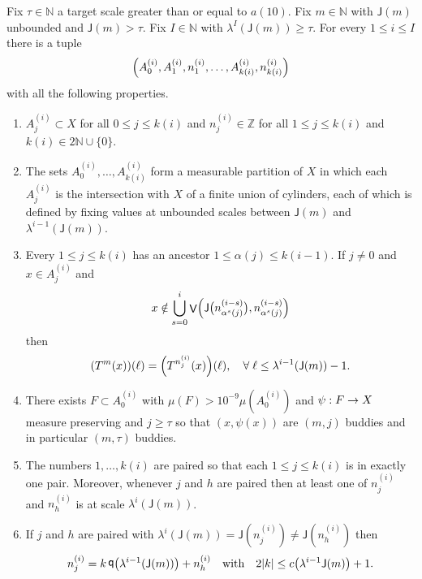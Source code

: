 \documentclass[10pt]{amsart}
\theoremstyle{definition}\newtheorem{defi}[theo]{Definition}\newtheorem{rema}[theo]{Remark}\newtheorem{exam}[theo]{Example}\newtheorem{exem}[theo]{Example}\newtheorem{nota}[theo]{Notation}
\DeclareMathOperator{\bad}{\mathsf{V}}
\DeclareMathOperator{\q}{\mathsf{q}}
\newcommand{\N}{\mathbb{N}}
\newcommand{\Z}{\mathbb{Z}}
\newcommand{\scl}{\mathsf{J}}
\let\originalleft\left
\let\originalright\right
\renewcommand{\left}{\mathopen{}\mathclose\bgroup\originalleft}
\renewcommand{\right}{\aftergroup\egroup\originalright}
\renewcommand*{\to}{\mathchoice{\longrightarrow}{\rightarrow}{\rightarrow}{\rightarrow}}
\newcommand*{\relabel}{\renewcommand{\labelenumi}{(\theenumi)}}
\newcommand*{\Eenumi}{\renewcommand*{\theenumi}{E\arabic{enumi}}\relabel}
\let\oldforall\forall
\renewcommand*{\forall}{\mathrel{\oldforall}}
\begin{document}
\begin{prop}\label{prop:reduction}
Fix $\tau \in \N$ a target scale greater than or equal to $a(10)$. Fix $m \in \N$ with $\scl(m)$ unbounded and $\scl(m) > \tau$. Fix $I \in \N$ with $\lambda^I(\scl(m)) \ge \tau$. For every $1 \le i \le I$ there is a tuple
\begin{equation}\label{eq:tuple}
\left(A_0^{(i)}, A_1^{(i)},n_1^{(i)}, \dots, A_{k(i)}^{(i)},n^{(i)}_{k(i)} \right)
\end{equation}
with all the following properties.
\begin{enumerate}\Eenumi
\item\label{cond:setup}
$A_j^{(i)} \subset X$ for all $0 \le j \le k(i)$ and $n^{(i)}_j \in \Z$ for all $1 \le j \le k(i)$ and $k(i) \in 2\N \cup \{0\}$.
\item\label{cond:partition}
The sets $A^{(i)}_0,\dots,A^{(i)}_{k(i)}$ form a measurable partition of $X$ in which each $A^{(i)}_j$ is the intersection with $X$ of a finite union of cylinders, each of which is defined by fixing values at unbounded scales between $\scl(m)$ and $\lambda^{i-1}(\scl(m))$.
\item\label{cond:agree}
Every $1 \le j \le k(i)$ has an ancestor $1 \le \alpha(j) \le k(i-1)$. If $j \ne 0$ and $x \in A_j^{(i)}$ and
\begin{equation}\label{eqn:bad ancestors}
x \notin \bigcup_{s=0}^i \bad \left(\scl \bigl(n^{(i-s)}_{\alpha^s(j)} \bigr), n^{(i-s)}_{\alpha^s(j)} \right)
\end{equation}
then
\begin{equation}\label{eq:same coords}
(T^m(x))(\ell) = \left(T^{n_j^{(i)}}(x)\right)(\ell),\quad \forall\ell\leq \lambda^{i-1}(\scl(m))-1.
\end{equation}
\item\label{cond:Azero friends}
There exists $F\subset A^{(i)}_0$ with $\mu(F)>10^{-9}\mu(A^{(i)}_0) $ and $\psi:F \to X$ measure preserving and $j \ge \tau$ so that $(x,\psi(x))$ are $(m,j)$ buddies and in particular $(m,\tau)$ buddies.
\item\label{cond:differ}
The numbers $1,\dots,k(i)$ are paired so that each $1 \le j \le k(i)$ is in exactly one pair. Moreover, whenever $j$ and $h$ are paired then at least one of $n_j^{(i)}$ and $n_h^{(i)}$ is at scale $\lambda^i(\scl(m))$.
\item\label{cond:paired numbers}
If $j$ and $h$ are paired with $\lambda^i(\scl(m)) = \scl(n_j^{(i)}) \ne \scl(n_h^{(i)})$ then
\[
n_j^{(i)}=k\q\left(\lambda^{i-1}(\scl(m))\right)+n_h^{(i)}\quad\text{with}\quad 2|k| \le c\left(\lambda^{i-1}\scl(m)\right) + 1.
\]
\end{enumerate}
\end{prop}
\end{document}
